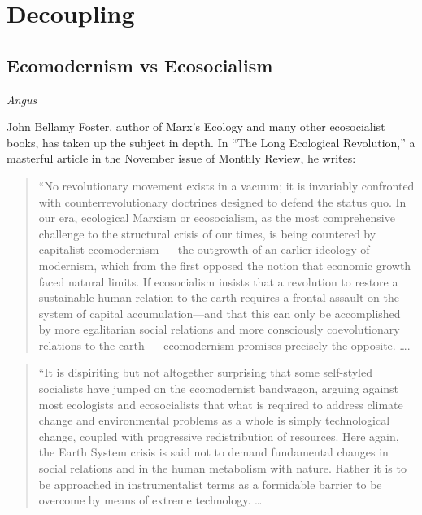 \documentclass[
]{book}
\begin{document}
\hypertarget{decoupling}{%
\chapter{Decoupling}\label{decoupling}}

\hypertarget{ecomodernism-vs-ecosocialism}{%
\section{Ecomodernism vs Ecosocialism}\label{ecomodernism-vs-ecosocialism}}

\emph{Angus}

John Bellamy Foster, author of Marx's Ecology and many other ecosocialist books, has taken up the subject in depth. In ``The Long Ecological Revolution,'' a masterful article in the November issue of Monthly Review, he writes:

\begin{quote}
``No revolutionary movement exists in a vacuum; it is invariably confronted with counterrevolutionary doctrines designed to defend the status quo. In our era, ecological Marxism or ecosocialism, as the most comprehensive challenge to the structural crisis of our times, is being countered by capitalist ecomodernism --- the outgrowth of an earlier ideology of modernism, which from the first opposed the notion that economic growth faced natural limits. If ecosocialism insists that a revolution to restore a sustainable human relation to the earth requires a frontal assault on the system of capital accumulation---and that this can only be accomplished by more egalitarian social relations and more consciously coevolutionary relations to the earth --- ecomodernism promises precisely the opposite. \ldots.
\end{quote}

\begin{quote}
``It is dispiriting but not altogether surprising that some self-styled socialists have jumped on the ecomodernist bandwagon, arguing against most ecologists and ecosocialists that what is required to address climate change and environmental problems as a whole is simply technological change, coupled with progressive redistribution of resources. Here again, the Earth System crisis is said not to demand fundamental changes in social relations and in the human metabolism with nature. Rather it is to be approached in instrumentalist terms as a formidable barrier to be overcome by means of extreme technology. \ldots{}
\end{quote}
\end{document}
